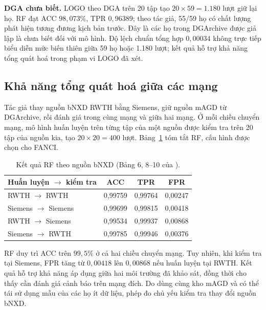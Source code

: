 \textbf{DGA chưa biết.} LOGO theo DGA trên 20 tập tạo $20\times59=1.180$ lượt giữ lại họ. RF đạt ACC $98{,}073\%$, TPR $0{,}96389$; theo tác giả, 55/59 họ có chất lượng phát hiện tương đương kịch bản trước. Đây là các họ trong DGArchive được giả lập là chưa biết đối với mô hình. Độ lệch chuẩn tổng hợp $0{,}00034$ không trực tiếp biểu diễn mức biến thiên giữa 59 họ hoặc 1.180 lượt; kết quả hỗ trợ khả năng tổng quát hoá trong phạm vi LOGO đã xét.

\subsection{Khả năng tổng quát hoá giữa các mạng}\label{sec:tong-quat-hoa}

Tác giả thay nguồn bNXD RWTH bằng Siemens, giữ nguồn mAGD từ DGArchive, rồi đánh giá trong cùng mạng và giữa hai mạng. Ở mỗi chiều chuyển mạng, mô hình huấn luyện trên từng tập của một nguồn được kiểm tra trên 20 tập của nguồn kia, tạo $20\times20=400$ lượt. Bảng~\ref{tab:c4-generalization} tóm tắt RF, cấu hình được chọn cho FANCI.

\begin{table}[H]
\centering
\caption{Kết quả RF theo nguồn bNXD (Bảng 6, 8--10 của \cite{schuppen2018fanci}).}
\label{tab:c4-generalization}
\begin{tabularx}{\textwidth}{|>{\raggedright\arraybackslash}X|c|c|c|}
\hline
\rowcolor{LightCyan}
\textbf{Huấn luyện $\rightarrow$ kiểm tra} & \textbf{ACC} & \textbf{TPR} & \textbf{FPR} \\ \hline
RWTH $\rightarrow$ RWTH & 0,99759 & 0,99764 & 0,00247 \\ \hline
Siemens $\rightarrow$ Siemens & 0,99699 & 0,99815 & 0,00418 \\ \hline
RWTH $\rightarrow$ Siemens & 0,99534 & 0,99937 & 0,00868 \\ \hline
Siemens $\rightarrow$ RWTH & 0,99785 & 0,99946 & 0,00376 \\ \hline
\end{tabularx}
\end{table}

RF duy trì ACC trên $99{,}5\%$ ở cả hai chiều chuyển mạng. Tuy nhiên, khi kiểm tra tại Siemens, FPR tăng từ $0{,}00418$ lên $0{,}00868$ nếu huấn luyện tại RWTH. Kết quả hỗ trợ khả năng áp dụng giữa hai môi trường đã khảo sát, đồng thời cho thấy cần đánh giá cảnh báo trên mạng đích. Do dùng cùng kho mAGD và có thể tái sử dụng mẫu của các họ ít dữ liệu, phép đo chủ yếu kiểm tra thay đổi nguồn bNXD.

